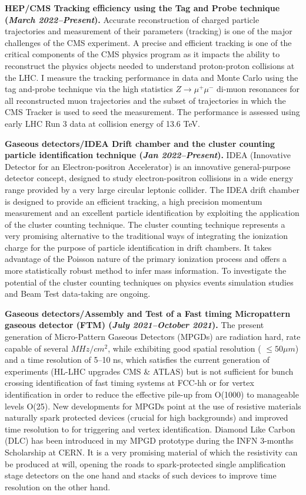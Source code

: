\documentclass[11pt]{res}
\begin{document}
\begin{resume}
\textbf{HEP/CMS Tracking efficiency using the Tag and Probe technique \textbf{(\textit{March 2022--Present})}.} Accurate reconstruction of charged particle trajectories and measurement of their parameters (tracking) is one of the major challenges of the CMS experiment. A precise and efficient tracking is one of the critical components of the CMS physics program as it impacts the ability to reconstruct the physics objects needed to understand proton-proton collisions at the LHC. I measure the tracking performance in data and Monte Carlo using the tag and-probe technique via the high statistics $Z\to \mu^{+} \mu^{-}$ di-muon resonances for all reconstructed muon trajectories and the subset of trajectories in which the CMS Tracker is used to seed the measurement. The performance is assessed using early LHC Run 3 data at collision energy of 13.6 TeV.

\textbf{Gaseous detectors/IDEA Drift chamber and the cluster counting particle identification technique \textbf{(\textit{Jan 2022--Present})}.} 
IDEA (Innovative Detector for an Electron-positron Accelerator) is an innovative general-purpose detector concept, designed to study electron-positron collisions in a wide energy range provided by a very large circular leptonic collider. The IDEA drift chamber is designed to provide an efficient tracking, a high precision momentum measurement and an excellent particle identification by exploiting the application of the cluster counting technique. The cluster counting technique represents a very promising alternative to the traditional ways of integrating the ionization charge for the purpose of particle identification in drift chambers. It takes advantage of the Poisson nature of the primary ionization process and offers a more statistically robust method to infer mass information. To investigate the potential of the cluster counting techniques on physics events simulation studies and Beam Test data-taking are ongoing.

\textbf{Gaseous detectors/Assembly and Test of a Fast timing Micropattern gaseous detector (FTM) \textbf{(\textit{July 2021--October 2021})}.} 
The present generation of Micro-Pattern Gaseous Detectors (MPGDs) are radiation hard, rate capable of several $MHz/cm^{2}$, while exhibiting good spatial resolution ( $\le 50\mu m$) and a time resolution of 5–10 ns, which satisfies the current generation of experiments (HL-LHC upgrades CMS \& ATLAS) but is not sufficient for bunch crossing identification of fast timing systems at FCC-hh or for vertex identification in order to reduce the effective pile-up from O(1000) to manageable levels O(25). New developments for MPGDs point at the use of resistive materials naturally spark protected devices (crucial for high backgrounds) and improved time resolution to for triggering and vertex identification. Diamond Like Carbon (DLC) has been introduced in my MPGD prototype during the INFN 3-months Scholarship at CERN. It is a very promising material of which the resistivity can be produced at will, opening the roads to spark-protected single amplification stage detectors on the one hand and stacks of such devices to improve time resolution on the other hand.


\end{resume}
\end{document}
